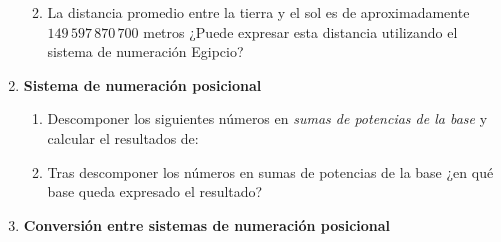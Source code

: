 \documentclass[12pt]{article}
\begin{document}
\begin{enumerate}
\begin{enumerate}

        \item La distancia promedio entre la tierra y el sol es de
            aproximadamente $149\,597\,870\,700$ metros ¿Puede expresar esta
            distancia utilizando el sistema de numeración Egipcio?

    \end{enumerate}

    \item \textbf{Sistema de numeración posicional}

        \begin{enumerate}

            \item Descomponer los siguientes números en \emph{sumas de potencias
                de la base} y calcular el resultados de:


            \item Tras descomponer los números en sumas de potencias de la
                base ¿en qué base queda expresado el resultado?

        \end{enumerate}

    \item \textbf{Conversión entre sistemas de numeración posicional}

    \begin{enumerate}


\end{enumerate}
\end{enumerate}
\end{document}
